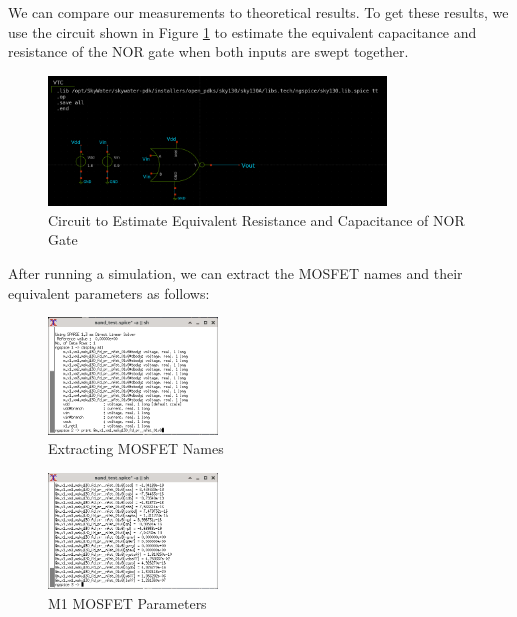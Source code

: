 \documentclass{article}
\begin{document}
	We can compare our measurements to theoretical results. To get these results, we use the circuit shown in Figure \ref{fig::nor_eq_test_sweep_va_vb} to estimate the equivalent capacitance and resistance of the NOR gate when both inputs are swept together.
	
	\begin{figure}[H]
		\centerline{\includegraphics[width=0.8\textwidth]{nor_eq_test_sweep_va_vb.png}}
		\caption{Circuit to Estimate Equivalent Resistance and Capacitance of NOR Gate}
		\label{fig::nor_eq_test_sweep_va_vb}
	\end{figure}
	
	\noindent After running a simulation, we can extract the MOSFET names and their equivalent parameters as follows:
	
	\begin{figure}[H]
		\centerline{\includegraphics[width=0.4\textwidth]{nand_eq_display_sweep_va_vb.png}}
		\caption{Extracting MOSFET Names}
		\label{fig::nor_eq_display_sweep_va_vb}
	\end{figure}
	
	\begin{figure}[H]
		\centerline{\includegraphics[width=0.4\textwidth]{nand_eq_params_sweep_va_vb.png}}
		\caption{M1 MOSFET Parameters}			\label{fig::nor_eq_params_sweep_va_vb}
	\end{figure}
	
\end{document}
